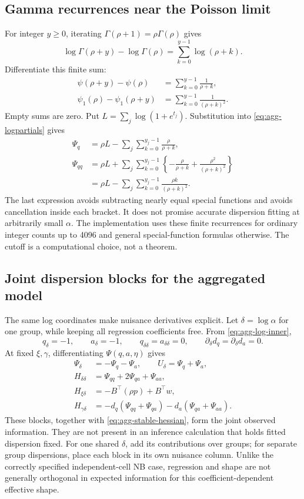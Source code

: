 \documentclass[11pt,a4paper]{article}
\numberwithin{equation}{section}
\begin{document}
\subsection{Gamma recurrences near the Poisson limit}
For integer $y\ge0$, iterating
$\Gamma(\rho+1)=\rho\Gamma(\rho)$ gives
\[
 \log\Gamma(\rho+y)-\log\Gamma(\rho)
   =\sum_{k=0}^{y-1}\log(\rho+k).
\]
Differentiate this finite sum:
\begin{align}
 \psi(\rho+y)-\psi(\rho)
 &=\sum_{k=0}^{y-1}\frac1{\rho+k},\\
 \psi_1(\rho)-\psi_1(\rho+y)
 &=\sum_{k=0}^{y-1}\frac1{(\rho+k)^2}.
\end{align}
Empty sums are zero. Put $L=\sum_j\log(1+e^{t_j})$.
Substitution into \eqref{eq:agg-logpartials} gives
\begin{align}
 \Psi_q&=\rho L-\sum_j\sum_{k=0}^{y_j-1}\frac{\rho}{\rho+k},\\
 \Psi_{qq}
 &=\rho L+\sum_j\sum_{k=0}^{y_j-1}
       \left\{-\frac{\rho}{\rho+k}
                      +\frac{\rho^2}{(\rho+k)^2}\right\}\\
 &=\rho L-\sum_j\sum_{k=0}^{y_j-1}
                         \frac{\rho k}{(\rho+k)^2}.
 \label{eq:gamma-stability}
\end{align}
The last expression avoids subtracting nearly equal special functions
and avoids cancellation inside each bracket.
It does not promise accurate dispersion fitting at arbitrarily small
$\alpha$. The implementation uses these finite recurrences for ordinary
integer counts up to 4096 and general special-function formulas otherwise.
The cutoff is a computational choice, not a theorem.

\subsection{Joint dispersion blocks for the aggregated model}
The same log coordinates make nuisance derivatives explicit.
Let $\delta=\log\alpha$ for one group, while keeping all regression
coefficients free. From \eqref{eq:agg-log-inner},
\[
 q_\delta=-1,\qquad a_\delta=-1,\qquad
 q_{\delta\delta}=a_{\delta\delta}=0,\qquad
 \partial_\delta d_q=\partial_\delta d_a=0.
\]
At fixed $\xi,\gamma$, differentiating $\Psi(q,a,\eta)$ gives
\begin{align}
 \Psi_\delta&=-\Psi_q-\Psi_a,\qquad
 U_\delta=\Psi_q+\Psi_a,\\
 H_{\delta\delta}&=\Psi_{qq}+2\Psi_{qa}+\Psi_{aa},\\
 H_{\xi\delta}&=-B^\top(\rho p)+B^\top w,\\
 H_{\gamma\delta}
 &=-d_q(\Psi_{qq}+\Psi_{qa})-d_a(\Psi_{qa}+\Psi_{aa}).
\end{align}
These blocks, together with \eqref{eq:agg-stable-hessian}, form
the joint observed information. They are not present in an inference
calculation that holds fitted dispersion fixed.
For one shared $\delta$, add its contributions over groups; for
separate group dispersions, place each block in its own nuisance column.
Unlike the correctly specified independent-cell NB case, regression
and shape are not generally orthogonal in expected information for
this coefficient-dependent effective shape.
\end{document}
